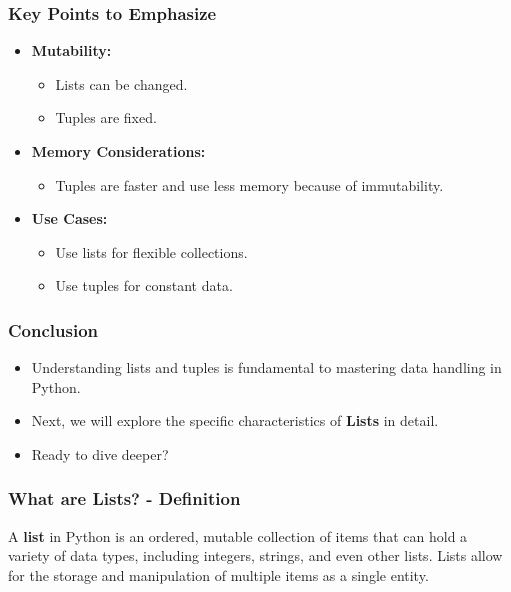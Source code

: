 \documentclass{beamer}
\begin{document}
\begin{frame}[fragile]
    \frametitle{Key Points to Emphasize}
    \begin{itemize}
        \item \textbf{Mutability:}
            \begin{itemize}
                \item Lists can be changed.
                \item Tuples are fixed.
            \end{itemize}
        \item \textbf{Memory Considerations:} 
            \begin{itemize}
                \item Tuples are faster and use less memory because of immutability.
            \end{itemize}
        \item \textbf{Use Cases:}
            \begin{itemize}
                \item Use lists for flexible collections.
                \item Use tuples for constant data.
            \end{itemize}
    \end{itemize}
\end{frame}

\begin{frame}[fragile]
    \frametitle{Conclusion}
    \begin{itemize}
        \item Understanding lists and tuples is fundamental to mastering data handling in Python.
        \item Next, we will explore the specific characteristics of \textbf{Lists} in detail.
        \item Ready to dive deeper?
    \end{itemize}
\end{frame}

\begin{frame}[fragile]
    \frametitle{What are Lists? - Definition}
    A \textbf{list} in Python is an ordered, mutable collection of items that can hold a variety of data types, including integers, strings, and even other lists. 
    Lists allow for the storage and manipulation of multiple items as a single entity.
\end{frame}
\end{document}
